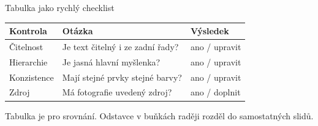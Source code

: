 \begin{frame}{Tabulka jako rychlý checklist}
  \begin{tabularx}{\linewidth}{@{}lXl@{}}
    \toprule
    Kontrola & Otázka & Výsledek \\
    \midrule
    Čitelnost & Je text čitelný i ze zadní řady? & ano / upravit \\
    Hierarchie & Je jasná hlavní myšlenka? & ano / upravit \\
    Konzistence & Mají stejné prvky stejné barvy? & ano / upravit \\
    Zdroj & Má fotografie uvedený zdroj? & ano / doplnit \\
    \bottomrule
  \end{tabularx}
  \vspace{4mm}
  \begin{Important}
    Tabulka je pro srovnání. Odstavce v buňkách raději rozděl do samostatných slidů.
  \end{Important}
\end{frame}
